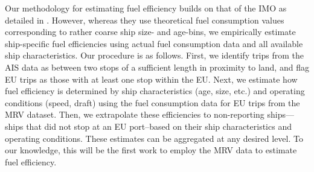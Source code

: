 \documentclass[hidelinks, 12pt,letterpaper]{article}
\begin{document}
Our methodology for estimating fuel efficiency builds on that of the IMO as detailed in \citet{faber2020fourth}.
However, whereas they use theoretical fuel consumption values corresponding to rather coarse ship size- and age-bins, we empirically estimate ship-specific fuel efficiencies using actual fuel consumption data and all available ship characteristics. 
Our procedure is as follows. First, we identify trips from the AIS data as between two stops of a sufficient length in proximity to land, and flag EU trips as those with at least one stop within the EU. 
Next, we estimate how fuel efficiency is determined by ship characteristics (age, size, etc.) and operating conditions (speed, draft) using the fuel consumption data for EU trips from the MRV dataset. 
Then, we extrapolate these efficiencies to non-reporting ships---ships that did not stop at an EU port--based on their ship characteristics and operating conditions.
These estimates can be aggregated at any desired level. To our knowledge, this will be the first work to employ the MRV data to estimate fuel efficiency. %
\end{document}
